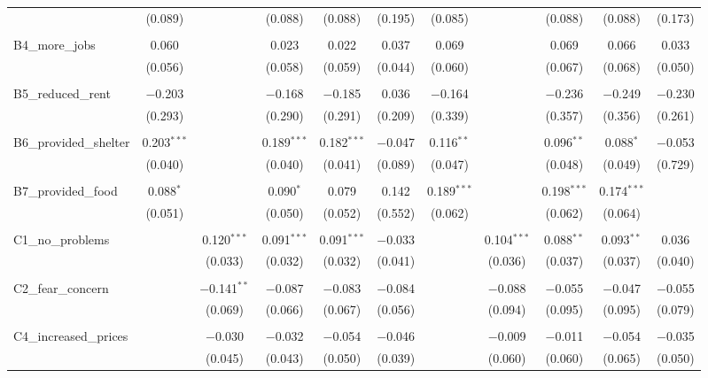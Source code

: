 \begin{table}[H]
\begin{tabular}{@{\extracolsep{4pt}}lcccccccccc}
  & (0.089) &  & (0.088) & (0.088) & (0.195) & (0.085) &  & (0.088) & (0.088) & (0.173) \\ 
  & & & & & & & & & & \\ 
 B4\_more\_jobs & 0.060 &  & 0.023 & 0.022 & 0.037 & 0.069 &  & 0.069 & 0.066 & 0.033 \\ 
  & (0.056) &  & (0.058) & (0.059) & (0.044) & (0.060) &  & (0.067) & (0.068) & (0.050) \\ 
  & & & & & & & & & & \\ 
 B5\_reduced\_rent & $-$0.203 &  & $-$0.168 & $-$0.185 & 0.036 & $-$0.164 &  & $-$0.236 & $-$0.249 & $-$0.230 \\ 
  & (0.293) &  & (0.290) & (0.291) & (0.209) & (0.339) &  & (0.357) & (0.356) & (0.261) \\ 
  & & & & & & & & & & \\ 
 B6\_provided\_shelter & 0.203$^{***}$ &  & 0.189$^{***}$ & 0.182$^{***}$ & $-$0.047 & 0.116$^{**}$ &  & 0.096$^{**}$ & 0.088$^{*}$ & $-$0.053 \\ 
  & (0.040) &  & (0.040) & (0.041) & (0.089) & (0.047) &  & (0.048) & (0.049) & (0.729) \\ 
  & & & & & & & & & & \\ 
 B7\_provided\_food & 0.088$^{*}$ &  & 0.090$^{*}$ & 0.079 & 0.142 & 0.189$^{***}$ &  & 0.198$^{***}$ & 0.174$^{***}$ &  \\ 
  & (0.051) &  & (0.050) & (0.052) & (0.552) & (0.062) &  & (0.062) & (0.064) &  \\ 
  & & & & & & & & & & \\ 
 C1\_no\_problems &  & 0.120$^{***}$ & 0.091$^{***}$ & 0.091$^{***}$ & $-$0.033 &  & 0.104$^{***}$ & 0.088$^{**}$ & 0.093$^{**}$ & 0.036 \\ 
  &  & (0.033) & (0.032) & (0.032) & (0.041) &  & (0.036) & (0.037) & (0.037) & (0.040) \\ 
  & & & & & & & & & & \\ 
 C2\_fear\_concern &  & $-$0.141$^{**}$ & $-$0.087 & $-$0.083 & $-$0.084 &  & $-$0.088 & $-$0.055 & $-$0.047 & $-$0.055 \\ 
  &  & (0.069) & (0.066) & (0.067) & (0.056) &  & (0.094) & (0.095) & (0.095) & (0.079) \\ 
  & & & & & & & & & & \\ 
 C4\_increased\_prices &  & $-$0.030 & $-$0.032 & $-$0.054 & $-$0.046 &  & $-$0.009 & $-$0.011 & $-$0.054 & $-$0.035 \\ 
  &  & (0.045) & (0.043) & (0.050) & (0.039) &  & (0.060) & (0.060) & (0.065) & (0.050) \\ 

\end{tabular}
\end{table}
